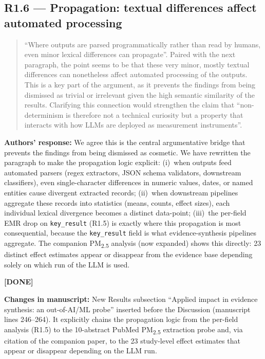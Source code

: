 \documentclass[11pt,a4paper]{article}
\newenvironment{revquote}{%
  \begin{quote}\small\itshape\color{revgray}
}{%
  \end{quote}
}
\newcommand{\response}[1]{\par\noindent\textbf{\color{revgreen}Authors' response:} #1\par}
\newcommand{\changes}[1]{\par\noindent\textbf{\color{revblue}Changes in manuscript:} #1\par}
\newcommand{\done}{\color{revgreen}\textbf{[DONE]}}
\begin{document}
\subsection*{R1.6 --- Propagation: textual differences affect automated processing}

\begin{revquote}
``Where outputs are parsed programmatically rather than read by humans, even minor lexical differences can propagate''. Paired with the next paragraph, the point seems to be that these very minor, mostly textual differences can nonetheless affect automated processing of the outputs. This is a key part of the argument, as it prevents the findings from being dismissed as trivial or irrelevant given the high semantic similarity of the results. Clarifying this connection would strengthen the claim that ``non-determinism is therefore not a technical curiosity but a property that interacts with how LLMs are deployed as measurement instruments''.
\end{revquote}

\response{We agree this is the central argumentative bridge that prevents the findings from being dismissed as cosmetic. We have rewritten the paragraph to make the propagation logic explicit: (i)~when outputs feed automated parsers (regex extractors, JSON schema validators, downstream classifiers), even single-character differences in numeric values, dates, or named entities cause divergent extracted records; (ii)~when downstream pipelines aggregate these records into statistics (means, counts, effect sizes), each individual lexical divergence becomes a distinct data-point; (iii)~the per-field EMR drop on \texttt{key\_result} (R1.5) is exactly where this propagation is most consequential, because the \texttt{key\_result} field is what evidence-synthesis pipelines aggregate. The companion PM\textsubscript{2.5} analysis (now expanded) shows this directly: 23 distinct effect estimates appear or disappear from the evidence base depending solely on which run of the LLM is used.} \done

\changes{New Results subsection ``Applied impact in evidence synthesis: an out-of-AI/ML probe'' inserted before the Discussion (manuscript lines 246--264). It explicitly chains the propagation logic from the per-field analysis (R1.5) to the 10-abstract PubMed PM\textsubscript{2.5} extraction probe and, via citation of the companion paper, to the 23 study-level effect estimates that appear or disappear depending on the LLM run.}
\end{document}
